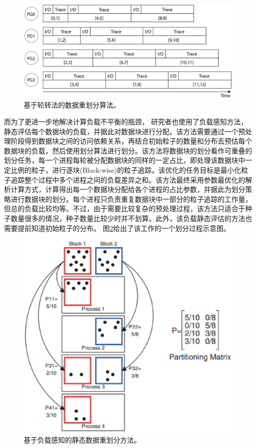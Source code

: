 \begin{figure}[!tb]
  \centering
  \includegraphics[width=\linewidth,keepaspectratio]{image/loadbalance/Round-robin.eps}
  \caption{
    基于轮转法的数据重划分算法\parencite{NouanesengsyLLSP12}。
 }
\label{fig:loadbalance:round-robin}
\end{figure}

而为了更进一步地解决计算负载不平衡的瓶颈，
研究者也使用了负载感知方法\parencite{NouanesengsyLS11}，静态评估每个数据块的负载，并据此对数据块进行分配。该方法需要通过一个预处理阶段得到数据块之间的访问依赖关系，再结合初始粒子的数量和分布去预估每个数据块的负载，然后使用划分算法进行划分。该方法将数据块的划分看作可重叠的划分任务，每一个进程每轮被分配数据块的同样的一定占比，即处理该数据块中一定比例的粒子，进行逐块(Block-wise)的粒子追踪。该优化的任务目标是最小化粒子追踪整个过程中多个进程之间的负载差异之和。该方法最终采用参数最优化的解析计算方式，计算得出每一个数据块分配给各个进程的占比参数，并据此为划分策略进行数据块的划分。每个进程只负责重复数据块中一部分的粒子追踪的工作量，但总的负载比较均等。不过，由于需要比较复杂的预处理过程，该方法只适合于种子数量很多的情况，种子数量比较少时并不划算。此外，该负载静态评估的方法也需要提前知道初始粒子的分布。
图\ref{fig:loadbalance:static_partition}给出了该工作的一个划分过程示意图。

\begin{figure}[!tb]
  \centering
  \includegraphics[width=.7\linewidth,keepaspectratio]{image/loadbalance/static_partition.eps}
  \caption{
    基于负载感知的静态数据重划分方法\parencite{NouanesengsyLS11}。
 }
\label{fig:loadbalance:static_partition}
\end{figure}

